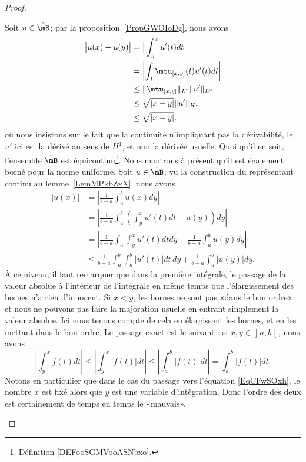 \begin{proof}
\begin{enumerate}
            Soit \( u\in \tilde \mB\); par la proposition~\ref{PropGWOIoDg}, nous avons
            \begin{subequations}
                \begin{align}
                    \big| u(x)-u(y) \big|&=\big| \int_y^xu'(t)dt \big|\\
                    &=\left| \int_I\mtu_{[x,y]}(t)u'(t)dt \right| \\
                    &\leq\| \mtu_{\mathopen[ x , y \mathclose]} \|_{L^2}\| u' \|_{L^2}\\
                    &\leq\sqrt{| x-y |}\| u' \|_{H^1}\\
                    &\leq\sqrt{| x-y |}.
                \end{align}
            \end{subequations}
            où nous insistons sur le fait que la continuité n'impliquant pas la dérivabilité, le \( u'\) ici est la dérivé au sens de \( H^1\), et non la dérivée usuelle. Quoi qu'il en soit, l'ensemble \(\tilde  \mB\) est équicontinu\footnote{Définition \ref{DEFooSGMVooASNbxo}.}. Nous montrons à présent qu'il est également borné pour la norme uniforme. Soit \( u\in\tilde \mB\); vu la construction du représentant continu au lemme~\ref{LemMPkbZxX}, nous avons
            \begin{subequations}
                \begin{align}
                \big| u(x) \big|&=\left| \frac{1}{ b-a }\int_a^bu(x)dy \right| \\
                &=\left| \frac{1}{ b-a }\int_a^b\left( \int_y^xu'(t)dt-u(y) \right)dy \right| \\
                &=\left| \frac{1}{ b-a }\int_a\int_y^xu'(t)dtdy-\frac{1}{ b-a }\int_a^b u(y)dy \right| \\
                &\leq\frac{1}{ b-a }\int_a^b\int_a^b| u'(t) |dt\,dy+\frac{1}{ b-a }\int_a^b| u(y) |dy \label{EqCFwSOxh}.
                \end{align}
            \end{subequations}
            À ce niveau, il faut remarquer que dans la première intégrale, le passage de la valeur absolue à l'intérieur de l'intégrale en même temps que l'élargissement des bornes n'a rien d'innocent. Si \( x<y\), les bornes ne sont pas «dans le bon ordre» et nous ne pouvons pas faire la majoration usuelle en entrant simplement la valeur absolue. Ici nous tenons compte de cela en élargissant les bornes, et en les mettant dans le bon ordre. Le passage exact est le suivant : si \( x,y\in\mathopen] a , b \mathclose[\), nous avons
                \begin{equation}
                \left| \int_y^xf(t)dt \right| \leq\left| \int_y^x| f(t) |dt \right| \leq\left| \int_a^b| f(t) |dt \right| =\int_a^b| f(t) |dt.
                \end{equation}
                Notons en particulier que dans le cas du passage vers l'équation \eqref{EqCFwSOxh}, le nombre \( x\) est fixé alors que \( y\) est une variable d'intégration. Donc l'ordre des deux est certainement de temps en temps le «mauvais».


\end{enumerate}
\end{proof}
